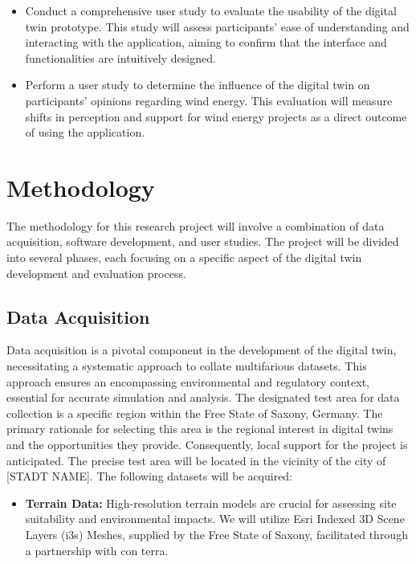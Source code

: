 \documentclass[11pt, titlepage, a4paper]{article}
\begin{document}
\begin{linenumbers}
\begin{itemize}[label={--}]
        \item Conduct a comprehensive user study to evaluate the usability of the digital twin prototype. This study will assess participants' ease of understanding and interacting with the application, aiming to confirm that the interface and functionalities are intuitively designed.
        \item Perform a user study to determine the influence of the digital twin on participants' opinions regarding wind energy. This evaluation will measure shifts in perception and support for wind energy projects as a direct outcome of using the application.
    \end{itemize}


    \section{Methodology}
    The methodology for this research project will involve a combination of data acquisition, software development, and user studies. The project will be divided into several phases, each focusing on a specific aspect of the digital twin development and evaluation process.

    \subsection{Data Acquisition}
    Data acquisition is a pivotal component in the development of the digital twin, necessitating a systematic approach to collate multifarious datasets. This approach ensures an encompassing environmental and regulatory context, essential for accurate simulation and analysis. The designated test area for data collection is a specific region within the Free State of Saxony, Germany. The primary rationale for selecting this area is the regional interest in digital twins and the opportunities they provide. Consequently, local support for the project is anticipated. The precise test area will be located in the vicinity of the city of [STADT NAME]. %
    The following datasets will be acquired:

    \begin{itemize}
        \item \textbf{Terrain Data:} High-resolution terrain models are crucial for assessing site suitability and environmental impacts. We will utilize Esri Indexed 3D Scene Layers (i3s) Meshes, supplied by the Free State of Saxony, facilitated through a partnership with con terra.


\end{itemize}
\end{linenumbers}
\end{document}
